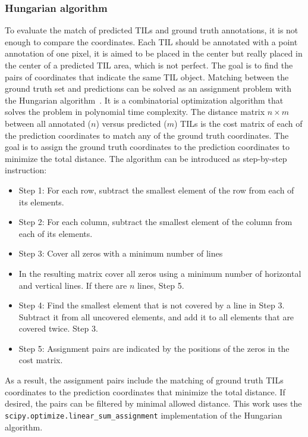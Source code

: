 \subsubsection{Hungarian algorithm}
To evaluate the match of predicted TILs and ground truth annotations,
it is not enough to compare the coordinates. Each TIL should be annotated
with a point annotation of one pixel, it is aimed to be placed in the center
but really placed in the center of a predicted TIL area, which is not perfect.
The goal is to find the pairs of coordinates that indicate the same TIL object.
Matching between the ground truth set and predictions can be solved as an assignment
problem with the Hungarian algorithm~\cite{kuhn1955hungarian}. It is a combinatorial
optimization algorithm that solves the problem in polynomial time complexity.
The distance matrix $n\times m$ between all annotated ($n$) versus predicted ($m$)
TILs is the cost matrix of each of the prediction coordinates to match any of the ground
truth coordinates. The goal is to assign the ground truth coordinates to the prediction
coordinates to minimize the total distance. The algorithm can be introduced as step-by-step instruction:
\begin{itemize}
  \itemsep0em 
  \item Step 1: For each row, subtract the smallest element of the row from each of its elements.
  \item Step 2: For each column, subtract the smallest element of the column from each of its elements.
  \item Step 3: Cover all zeros with a minimum number of lines
  \item[] In the resulting matrix cover all zeros using a minimum number of horizontal and vertical lines. 
  If there are $n$ lines, Step 5.
  \item Step 4: Find the smallest element that is not covered by a line in Step 3.
  Subtract it from all uncovered elements, and add it to all elements that are covered twice. Step 3.
  \item Step 5: Assignment pairs are indicated by the positions of the zeros in the cost matrix. 
\end{itemize}
As a result, the assignment pairs include the matching of ground truth TILs coordinates to the
prediction coordinates that minimize the total distance. If desired, the pairs can be filtered
by minimal allowed distance. This work uses the \verb+scipy.optimize.linear_sum_assignment+
implementation of the Hungarian algorithm.

